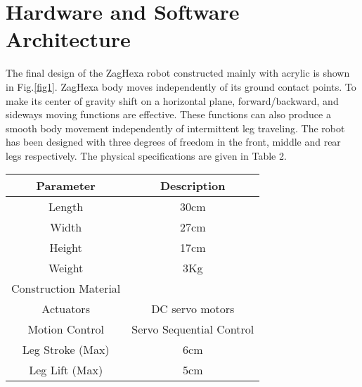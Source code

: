 \section{Hardware and Software Architecture}
The final design of the ZagHexa robot constructed mainly with acrylic is shown in Fig.\ref{fig1}. ZagHexa body moves independently of its ground contact points. To make its center of gravity shift on a horizontal plane, forward/backward, and sideways moving functions are effective. These functions can also produce a smooth body movement independently of intermittent leg traveling. The robot has been designed with three degrees of freedom in the front, middle and rear legs respectively. The physical specifications are given in Table 2.\\
\begin{center}
\begin{tabular}{|c|c|}
    \hline
    Parameter       &       Description        \\ \hline
    Length         &           30cm           \\ \hline
    Width         &           27cm           \\ \hline
    Height         &           17cm           \\ \hline
    Weight         &           3Kg            \\ \hline
    Construction Material &                          \\ \hline
    Actuators       &     DC servo motors      \\ \hline
    Motion Control     & Servo Sequential Control \\ \hline
    Leg Stroke (Max)    &           6cm            \\ \hline
    Leg Lift (Max)     &           5cm            \\ \hline
\end{tabular}
\end{center}

